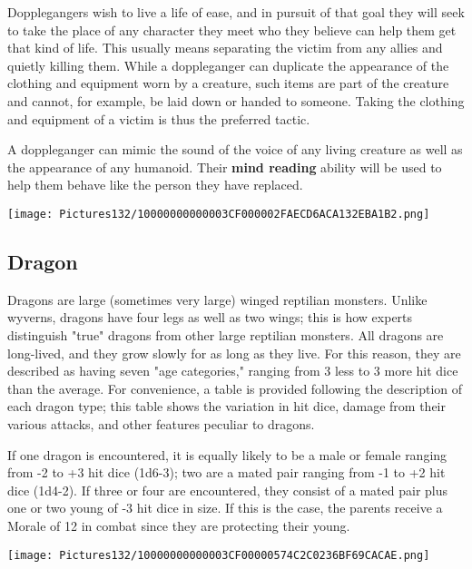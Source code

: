 \documentclass[a4paper,twoside,openany,10pt]{book}
\begin{document}
\begin{multicols}{2}
Dopplegangers wish to live a life of ease, and in pursuit of that goal they will seek to take the place of any character they meet who they believe can help them get that kind of life. This usually means separating the victim from any allies and quietly killing them. While a doppleganger can duplicate the appearance of the clothing and equipment worn by a creature, such items are part of the creature and cannot, for example, be laid down or handed to someone. Taking the clothing and equipment of a victim is thus the preferred tactic.

A doppleganger can mimic the sound of the voice of any living creature as well as the appearance of any humanoid. Their \textbf{mind reading} ability will be used to help them behave like the person they have replaced.


\begin{center}
	\texttt{[image: Pictures132/10000000000003CF000002FAECD6ACA132EBA1B2.png]}
\end{center}

\subsection*{Dragon}\label{dragon}

Dragons are large (sometimes very large) winged reptilian monsters. Unlike wyverns, dragons have four legs as well as two wings; this is how experts distinguish "true" dragons from other large reptilian monsters. All dragons are long-lived, and they grow slowly for as long as they live. For this reason, they are described as having seven "age categories," ranging from 3 less to 3 more hit dice than the average. For convenience, a table is provided following the description of each dragon type; this table shows the variation in hit dice, damage from their various attacks, and other features peculiar to dragons. 

If one dragon is encountered, it is equally likely to be a male or female ranging from -2 to +3 hit dice (1d6-3); two are a mated pair ranging from -1 to +2 hit dice (1d4-2). If three or four are encountered, they consist of a mated pair plus one or two young of -3 hit dice in size. If this is the case, the parents receive a Morale of 12 in combat since they are protecting their young.


\begin{center}
	\texttt{[image: Pictures132/10000000000003CF00000574C2C0236BF69CACAE.png]}
\end{center}


\end{multicols}
\end{document}

